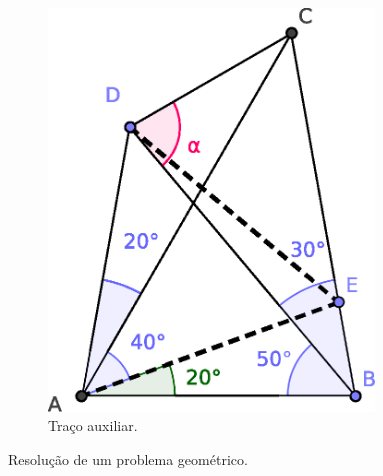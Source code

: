 \begin{itemize}
\begin{figure}[!h]
\begin{subfigure}[b]{0.4\textwidth}
         \includegraphics[width=0.95\textwidth]{chapters/cap-learning/prob-geometria2.eps} 
         \caption{Traço auxiliar.}
         \label{fig:geometria:b}
     \end{subfigure}
  \caption{Resolução de um problema geométrico.}
\label{fig:geometria}
\end{figure}


\end{itemize}
